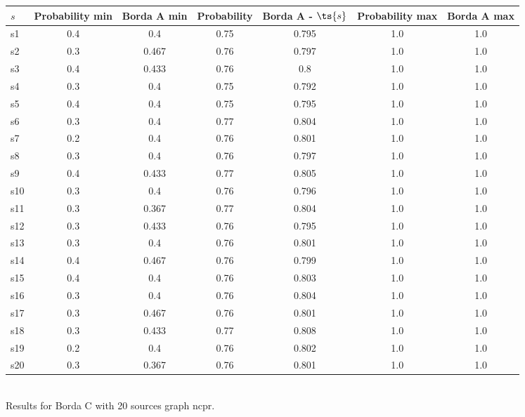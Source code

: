 \documentclass{article}
\begin{document}
\noindent\begin{tabular}{|l|c|c|c|c|c|c|}
\hline
$s$& Probability min & Borda A min & Probability & Borda A - $\ts{s}$ & Probability max & Borda A max\\
\hline
s1 &0.4 & 0.4 & 0.75 & 0.795 & 1.0 & 1.0\\
\hline
s2 &0.3 & 0.467 & 0.76 & 0.797 & 1.0 & 1.0\\
\hline
s3 &0.4 & 0.433 & 0.76 & 0.8 & 1.0 & 1.0\\
\hline
s4 &0.3 & 0.4 & 0.75 & 0.792 & 1.0 & 1.0\\
\hline
s5 &0.4 & 0.4 & 0.75 & 0.795 & 1.0 & 1.0\\
\hline
s6 &0.3 & 0.4 & 0.77 & 0.804 & 1.0 & 1.0\\
\hline
s7 &0.2 & 0.4 & 0.76 & 0.801 & 1.0 & 1.0\\
\hline
s8 &0.3 & 0.4 & 0.76 & 0.797 & 1.0 & 1.0\\
\hline
s9 &0.4 & 0.433 & 0.77 & 0.805 & 1.0 & 1.0\\
\hline
s10 &0.3 & 0.4 & 0.76 & 0.796 & 1.0 & 1.0\\
\hline
s11 &0.3 & 0.367 & 0.77 & 0.804 & 1.0 & 1.0\\
\hline
s12 &0.3 & 0.433 & 0.76 & 0.795 & 1.0 & 1.0\\
\hline
s13 &0.3 & 0.4 & 0.76 & 0.801 & 1.0 & 1.0\\
\hline
s14 &0.4 & 0.467 & 0.76 & 0.799 & 1.0 & 1.0\\
\hline
s15 &0.4 & 0.4 & 0.76 & 0.803 & 1.0 & 1.0\\
\hline
s16 &0.3 & 0.4 & 0.76 & 0.804 & 1.0 & 1.0\\
\hline
s17 &0.3 & 0.467 & 0.76 & 0.801 & 1.0 & 1.0\\
\hline
s18 &0.3 & 0.433 & 0.77 & 0.808 & 1.0 & 1.0\\
\hline
s19 &0.2 & 0.4 & 0.76 & 0.802 & 1.0 & 1.0\\
\hline
s20 &0.3 & 0.367 & 0.76 & 0.801 & 1.0 & 1.0\\
\hline
\end{tabular}\\

\noindent Results for Borda C with 20 sources graph ncpr.
\end{document}
